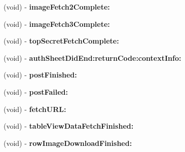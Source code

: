 \begin{DoxyCompactItemize}
\item 
\hypertarget{interface_app_delegate_07_08_ad3faea8b1ccf1678112b692681b0a0f4}{
(void) -\/ {\bfseries image\-Fetch2\-Complete\-:}}
\label{interface_app_delegate_07_08_ad3faea8b1ccf1678112b692681b0a0f4}

\item 
\hypertarget{interface_app_delegate_07_08_a529d0776c3f0a9fc82d1b914e134574e}{
(void) -\/ {\bfseries image\-Fetch3\-Complete\-:}}
\label{interface_app_delegate_07_08_a529d0776c3f0a9fc82d1b914e134574e}

\item 
\hypertarget{interface_app_delegate_07_08_a5aabd9eddc120b2b0596ad9e16a6e550}{
(void) -\/ {\bfseries top\-Secret\-Fetch\-Complete\-:}}
\label{interface_app_delegate_07_08_a5aabd9eddc120b2b0596ad9e16a6e550}

\item 
\hypertarget{interface_app_delegate_07_08_a4105cf0e53153c648732d346a3d36a4f}{
(void) -\/ {\bfseries auth\-Sheet\-Did\-End\-:return\-Code\-:context\-Info\-:}}
\label{interface_app_delegate_07_08_a4105cf0e53153c648732d346a3d36a4f}

\item 
\hypertarget{interface_app_delegate_07_08_ac85d1ef9bdb254c0fe788fe536d6d5fe}{
(void) -\/ {\bfseries post\-Finished\-:}}
\label{interface_app_delegate_07_08_ac85d1ef9bdb254c0fe788fe536d6d5fe}

\item 
\hypertarget{interface_app_delegate_07_08_a75c2c2f337b6b7c499fd504bedc6cab8}{
(void) -\/ {\bfseries post\-Failed\-:}}
\label{interface_app_delegate_07_08_a75c2c2f337b6b7c499fd504bedc6cab8}

\item 
\hypertarget{interface_app_delegate_07_08_a4bf047dd192c26f94681048c15b2623f}{
(void) -\/ {\bfseries fetch\-U\-R\-L\-:}}
\label{interface_app_delegate_07_08_a4bf047dd192c26f94681048c15b2623f}

\item 
\hypertarget{interface_app_delegate_07_08_af9480a3ce0a0cb0f6c04e3cf9de252ea}{
(void) -\/ {\bfseries table\-View\-Data\-Fetch\-Finished\-:}}
\label{interface_app_delegate_07_08_af9480a3ce0a0cb0f6c04e3cf9de252ea}

\item 
\hypertarget{interface_app_delegate_07_08_ac7cd855f8dca00fb2f04edf71c42bfaa}{
(void) -\/ {\bfseries row\-Image\-Download\-Finished\-:}}
\label{interface_app_delegate_07_08_ac7cd855f8dca00fb2f04edf71c42bfaa}


\end{DoxyCompactItemize}
